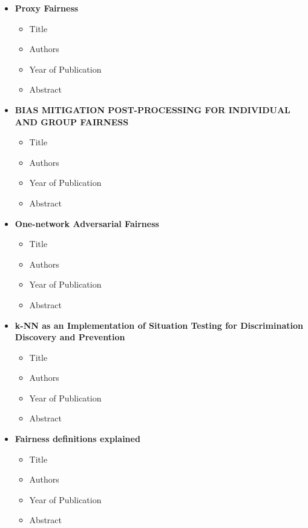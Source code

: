 \documentclass{article}
\begin{document}
\begin{itemize}
\begin{itemize}
        \item \textbf{Proxy Fairness}
        \begin{itemize}
            \item Title
            \item Authors
            \item Year of Publication
            \item Abstract
        \end{itemize}
        
        \item \textbf{BIAS MITIGATION POST-PROCESSING FOR INDIVIDUAL AND GROUP FAIRNESS}
        \begin{itemize}
            \item Title
            \item Authors
            \item Year of Publication
            \item Abstract
        \end{itemize}
        
        \item \textbf{One-network Adversarial Fairness}
        \begin{itemize}
            \item Title
            \item Authors
            \item Year of Publication
            \item Abstract
        \end{itemize}
        
        \item \textbf{k-NN as an Implementation of Situation Testing for Discrimination Discovery and Prevention}
        \begin{itemize}
            \item Title
            \item Authors
            \item Year of Publication
            \item Abstract
        \end{itemize}
        
        \item \textbf{Fairness definitions explained}
        \begin{itemize}
            \item Title
            \item Authors
            \item Year of Publication
            \item Abstract
        \end{itemize}
        

\end{itemize}
\end{itemize}
\end{document}

